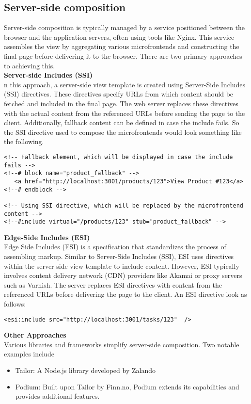 \subsection{Server-side composition}
Server-side composition is typically managed by a service positioned between the browser and the application servers, often using tools like Nginx. This service assembles the view by aggregating various microfrontends and constructing the final page before delivering it to the browser. There are two primary approaches to achieving this.\\

\noindent
\textbf{Server-side Includes (SSI)}\\
n this approach, a server-side view template is created using Server-Side Includes (SSI) directives. These directives specify URLs from which content should be fetched and included in the final page. The web server replaces these directives with the actual content from the referenced URLs before sending the page to the client. Additionally, fallback content can be defined in case the include fails. So the SSI directive used to compose the microfrontends would look something like the following.
\begin{verbatim}
<!-- Fallback element, which will be displayed in case the include
fails -->
<!--# block name="product_fallback" -->
   <a href="http://localhost:3001/products/123">View Product #123</a>
<!--# endblock -->

<!-- Using SSI directive, which will be replaced by the microfrontend
content -->
<!--#include virtual="/products/123" stub="product_fallback" -->
\end{verbatim}

\noindent
\textbf{Edge-Side Includes (ESI)}\\
Edge Side Includes (ESI) is a specification that standardizes the process of assembling markup. Similar to Server-Side Includes (SSI), ESI uses directives within the server-side view template to include content. However, ESI typically involves content delivery network (CDN) providers like Akamai or proxy servers such as Varnish. The server replaces ESI directives with content from the referenced URLs before delivering the page to the client. An ESI directive look as follows:
\begin{verbatim}
<esi:include src="http://localhost:3001/tasks/123"  />
\end{verbatim}

\noindent
\textbf{Other Approaches}\\
Various libraries and frameworks simplify server-side composition. Two notable examples include
\begin{itemize}
   \item Tailor: A Node.js library developed by Zalando
   \item Podium: Built upon Tailor by Finn.no, Podium extends its capabilities and provides additional features. \cite{MicrofrontendsInAction}
\end{itemize}

